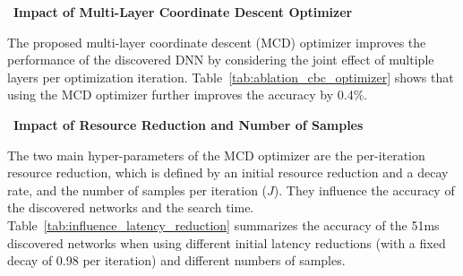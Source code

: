 \begin{table}[t]
\centering
{}
\caption{The ablation study of the channel-level bypass connections (CBCs) and the multi-layer coordinate descent optimizer (MCD) on ImageNet. The latency of the discovered networks is around 51ms, and ordered dropout is used.}
\label{tab:ablation_cbc_optimizer}
\end{table}

\noindent \textbullet\ \textbf{Impact of Multi-Layer Coordinate Descent Optimizer}

The proposed multi-layer coordinate descent (MCD) optimizer improves the performance of the discovered DNN by considering the joint effect of multiple layers per optimization iteration. Table~\ref{tab:ablation_cbc_optimizer} shows that using the MCD optimizer further improves the accuracy by 0.4\%.


\noindent \textbullet\ \textbf{Impact of Resource Reduction and Number of Samples}

The two main hyper-parameters of the MCD optimizer are the per-iteration resource reduction, which is defined by an initial resource reduction and a decay rate, and the number of samples per iteration ($J$). They influence the accuracy of the discovered networks and the search time. Table~\ref{tab:influence_latency_reduction} summarizes the accuracy of the 51ms discovered networks when using different initial latency reductions (with a fixed decay of 0.98 per iteration) and different numbers of samples.

